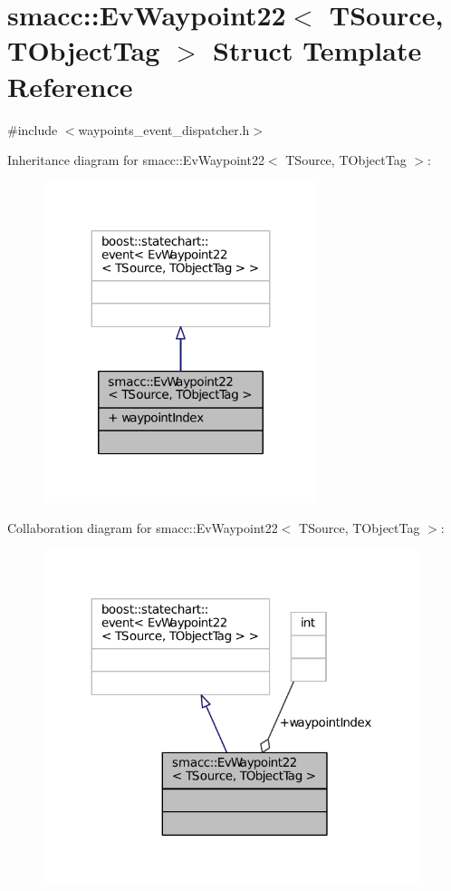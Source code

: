 \hypertarget{structsmacc_1_1EvWaypoint22}{}\section{smacc\+:\+:Ev\+Waypoint22$<$ T\+Source, T\+Object\+Tag $>$ Struct Template Reference}
\label{structsmacc_1_1EvWaypoint22}


{\ttfamily \#include $<$waypoints\+\_\+event\+\_\+dispatcher.\+h$>$}



Inheritance diagram for smacc\+:\+:Ev\+Waypoint22$<$ T\+Source, T\+Object\+Tag $>$\+:
\nopagebreak
\begin{figure}[H]
\begin{center}
\leavevmode
\includegraphics[width=227pt]{structsmacc_1_1EvWaypoint22__inherit__graph}
\end{center}
\end{figure}


Collaboration diagram for smacc\+:\+:Ev\+Waypoint22$<$ T\+Source, T\+Object\+Tag $>$\+:
\nopagebreak
\begin{figure}[H]
\begin{center}
\leavevmode
\includegraphics[width=312pt]{structsmacc_1_1EvWaypoint22__coll__graph}
\end{center}
\end{figure}
